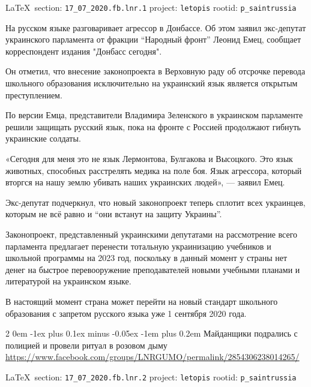 \documentclass[a4paper,11pt]{extreport}
\makeatletter
\renewcommand\subsection{%
  \clearpage
    \@startsection{subsection}%
    {2}%
    {0em}%
    {-1ex plus 0.1ex minus -0.05ex}%
    {-1em plus 0.2em}%
    {\scshape\bfseries\Large}%
}
\makeatother
\begin{document}
\vspace{0.5cm}
{\ifDEBUG\small\LaTeX~section: \verb|17_07_2020.fb.lnr.1| project: \verb|letopis| rootid: \verb|p_saintrussia|\fi}
\vspace{0.5cm}

На русском языке разговаривает агрессор в Донбассе. Об этом заявил экс-депутат
украинского парламента от фракции “Народный фронт” Леонид Емец, сообщает
корреспондент издания "Донбасс сегодня".

Он отметил, что внесение законопроекта в Верховную раду об отсрочке перевода
школьного образования исключительно на украинский язык является открытым
преступлением.

По версии Емца, представители Владимира Зеленского в украинском парламенте
решили защищать русский язык, пока на фронте с Россией продолжают гибнуть
украинские солдаты.

«Сегодня для меня это не язык Лермонтова, Булгакова и Высоцкого. Это язык
животных, способных расстрелять медика на поле боя. Язык агрессора, который
вторгся на нашу землю убивать наших украинских людей», --- заявил Емец.

Экс-депутат подчеркнул, что новый законопроект теперь сплотит всех украинцев,
которым не всё равно и “они встанут на защиту Украины”.

Законопроект, представленный украинскими депутатами на рассмотрение всего
парламента предлагает перенести тотальную украинизацию учебников и школьной
программы на 2023 год, поскольку в данный момент у страны нет денег на быстрое
перевооружение преподавателей новыми учебными планами и литературой на
украинском языке.

В настоящий момент страна может перейти на новый стандарт школьного образования
с запретом русского языка уже 1 сентября 2020 года. 
 
 
\subsection{Майданщики подрались с полицией и провели ритуал в розовом дыму}
\label{sec:17_07_2020.fb.lnr.2}
\url{https://www.facebook.com/groups/LNRGUMO/permalink/2854306238014265/}
  
\vspace{0.5cm}
{\ifDEBUG\small\LaTeX~section: \verb|17_07_2020.fb.lnr.2| project: \verb|letopis| rootid: \verb|p_saintrussia|\fi}
\vspace{0.5cm}
\end{document}
